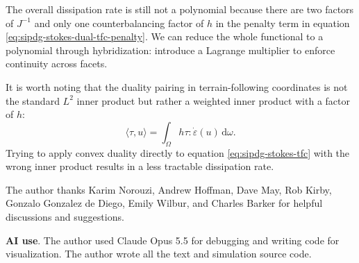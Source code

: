 \documentclass[gmd, manuscript]{copernicus}
\begin{document}
The overall dissipation rate is still not a polynomial because there are two factors of $J^{-1}$ and only one counterbalancing factor of $h$ in the penalty term in equation \eqref{eq:sipdg-stokes-dual-tfc-penalty}.
We can reduce the whole functional to a polynomial through hybridization: introduce a Lagrange multiplier to enforce continuity across facets.

It is worth noting that the duality pairing in terrain-following coordinates is not the standard $L^2$ inner product but rather a weighted inner product with a factor of $h$:
\begin{equation}
    \langle \tau, u\rangle = \int_\Omega h\tau : \dot\varepsilon(u)\,\mathrm d\omega.
\end{equation}
Trying to apply convex duality directly to equation \eqref{eq:sipdg-stokes-tfc} with the wrong inner product results in a less tractable dissipation rate.


\noappendix




\begin{acknowledgements}
The author thanks Karim Norouzi, Andrew Hoffman, Dave May, Rob Kirby, Gonzalo Gonzalez de Diego, Emily Wilbur, and Charles Barker for helpful discussions and suggestions.

\textbf{AI use}.
The author used Claude Opus 5.5 for debugging and writing code for visualization.
The author wrote all the text and simulation source code.
\end{acknowledgements}




\end{document}
